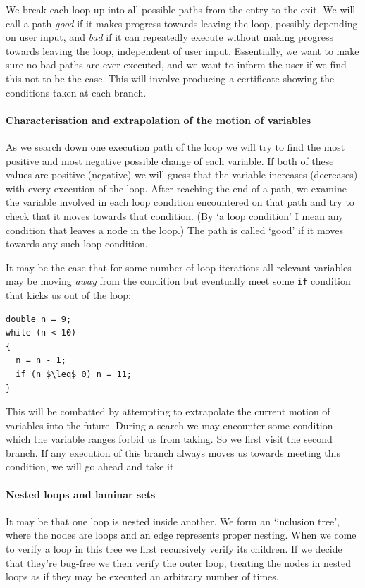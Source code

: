 \documentclass[12pt,a4paper]{article}
\begin{document}
We break each loop up into all possible paths from the entry to the exit. We will call a path \emph{good} if it makes progress towards leaving the loop,
possibly depending on user input, and \emph{bad} if it can repeatedly execute without making progress towards leaving the loop, independent of user input.
Essentially, we want to make sure no bad paths are ever executed, and we want to inform the user if we find this not to be the case.
This will involve producing a certificate showing the conditions taken at each branch.

\paragraph{Characterisation and extrapolation of the motion of variables}
As we search down one execution path of the loop we will try to find the most positive and most negative possible change of each variable. If both of these values
are positive (negative) we will guess that the variable increases (decreases) with every execution of the loop. After reaching the end of a path, we examine the 
variable involved in each loop condition encountered on that path and try to check that it moves towards that condition. (By `a loop condition' I mean any condition that leaves a 
node in the loop.) The path is called `good' if it moves towards any such loop condition.

It may be the case that for some number of loop iterations all relevant variables may be moving \textit{away} from the 
condition but eventually meet some \texttt{if} condition that kicks us out of the loop:
\begin{lstlisting}[frame=tlrb,language=myLang,label={lst:trickloop}, mathescape=true, numbers=none]
double n = 9;
while (n < 10)
{
  n = n - 1;
  if (n $\leq$ 0) n = 11;
}
\end{lstlisting}
This will be combatted by attempting to extrapolate the current motion of variables into the future. During a search we may encounter some condition
which the variable ranges forbid us from taking. So we first visit the second branch. If any execution of this branch always moves us towards meeting
this condition, we will go ahead and take it.

\paragraph{Nested loops and laminar sets}
It may be that one loop is nested inside another. We form an `inclusion tree', where the nodes are loops and an edge represents proper nesting. When we come to verify a loop in this tree we first recursively verify its children.
If we decide that they're bug-free we then verify the outer loop, treating the nodes in nested loops as if they may be executed an arbitrary number of times.
\end{document}
